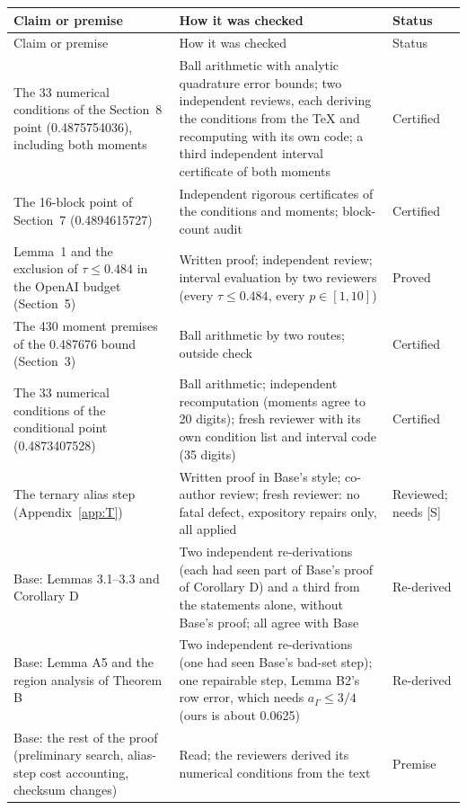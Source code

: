 \documentclass[11pt]{article}
\theoremstyle{plain}
\begin{document}
{\small
\begin{longtable}{@{}>{\raggedright\arraybackslash}p{4.2cm}>{\raggedright\arraybackslash}p{8.7cm}>{\raggedright\arraybackslash}p{2.6cm}@{}}
\toprule
Claim or premise & How it was checked & Status \\
\midrule
\endfirsthead
\toprule
Claim or premise & How it was checked & Status \\
\midrule
\endhead
\bottomrule
\endlastfoot
The 33 numerical conditions of the Section~8 point (0.4875754036), including both moments & Ball arithmetic with analytic quadrature error bounds; two independent reviews, each deriving the conditions from the \TeX{} and recomputing with its own code; a third independent interval certificate of both moments & Certified \\
The 16-block point of Section~7 (0.4894615727) & Independent rigorous certificates of the conditions and moments; block-count audit & Certified \\
Lemma~1 and the exclusion of $\tau \le 0.484$ in the OpenAI budget (Section~5) & Written proof; independent review; interval evaluation by two reviewers (every $\tau \le 0.484$, every $p \in [1,10]$) & Proved \\
The 430 moment premises of the 0.487676 bound (Section~3) & Ball arithmetic by two routes; outside check & Certified \\
The 33 numerical conditions of the conditional point (0.4873407528) & Ball arithmetic; independent recomputation (moments agree to 20 digits); fresh reviewer with its own condition list and interval code (35 digits) & Certified \\
The ternary alias step (Appendix~\ref{app:T}) & Written proof in Base's style; co-author review; fresh reviewer: no fatal defect, expository repairs only, all applied & Reviewed; needs [S] \\
Base: Lemmas 3.1--3.3 and Corollary D & Two independent re-derivations (each had seen part of Base's proof of Corollary D) and a third from the statements alone, without Base's proof; all agree with Base & Re-derived \\
Base: Lemma A5 and the region analysis of Theorem B & Two independent re-derivations (one had seen Base's bad-set step); one repairable step, Lemma B2's row error, which needs $a_\Gamma \le 3/4$ (ours is about 0.0625) & Re-derived \\
Base: the rest of the proof (preliminary search, alias-step cost accounting, checksum changes) & Read; the reviewers derived its numerical conditions from the text & Premise \\

\end{longtable}}
\end{document}
